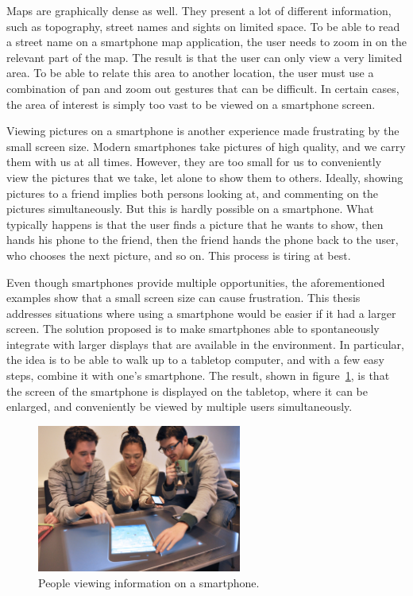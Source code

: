 Maps are graphically dense as well.
They present a lot of different information, such as topography, street names and sights on limited space.
To be able to read a street name on a smartphone map application, the user needs to zoom in on the relevant part of the map.
The result is that the user can only view a very limited area.
To be able to relate this area to another location, the user must use a combination of pan and zoom out gestures that can be difficult.
In certain cases, the area of interest is simply too vast to be viewed on a smartphone screen.

Viewing pictures on a smartphone is another experience made frustrating by the small screen size.
Modern smartphones take pictures of high quality, and we carry them with us at all times.
However, they are too small for us to conveniently view the pictures that we take, let alone to show them to others.
Ideally, showing pictures to a friend implies both persons looking at, and commenting on the pictures simultaneously.
But this is hardly possible on a smartphone.
What typically happens is that the user finds a picture that he wants to show, then hands his phone to the friend, then the friend hands the phone back to the user, who chooses the next picture, and so on.
This process is tiring at best.

Even though smartphones provide multiple opportunities, the aforementioned examples show that a small screen size can cause frustration.
This thesis addresses situations where using a smartphone would be easier if it had a larger screen.
The solution proposed is to make smartphones able to spontaneously integrate with larger displays that are available in the environment.
In particular, the idea is to be able to walk up to a tabletop computer, and with a few easy steps, combine it with one's smartphone.
The result, shown in figure~\ref{fig:tide}, is that the screen of the smartphone is displayed on the tabletop, where it can be enlarged, and conveniently be viewed by multiple users simultaneously.

\begin{figure}[htb]
  \centering
    \includegraphics[width=0.6\textwidth]{images/tide456}
  \caption{People viewing information on a smartphone.}
  \label{fig:tide}
\end{figure}

